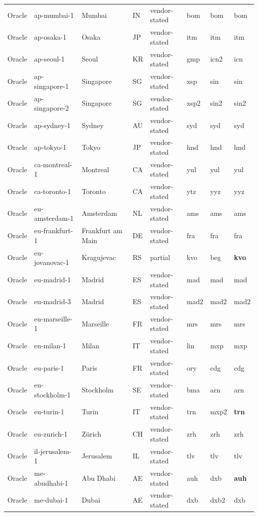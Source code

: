 \begin{longtable}{llllllll}
Oracle & ap-mumbai-1 & Mumbai & IN & vendor-stated & bom & bom & bom \\
Oracle & ap-osaka-1 & Osaka & JP & vendor-stated & itm & itm & itm \\
Oracle & ap-seoul-1 & Seoul & KR & vendor-stated & gmp & icn2 & icn \\
Oracle & ap-singapore-1 & Singapore & SG & vendor-stated & xsp & sin & sin \\
Oracle & ap-singapore-2 & Singapore & SG & vendor-stated & xsp2 & sin2 & sin2 \\
Oracle & ap-sydney-1 & Sydney & AU & vendor-stated & syd & syd & syd \\
Oracle & ap-tokyo-1 & Tokyo & JP & vendor-stated & hnd & hnd & hnd \\
Oracle & ca-montreal-1 & Montreal & CA & vendor-stated & yul & yul & yul \\
Oracle & ca-toronto-1 & Toronto & CA & vendor-stated & ytz & yyz & yyz \\
Oracle & eu-amsterdam-1 & Amsterdam & NL & vendor-stated & ams & ams & ams \\
Oracle & eu-frankfurt-1 & Frankfurt am Main & DE & vendor-stated & fra & fra & fra \\
Oracle & eu-jovanovac-1 & Kragujevac & RS & partial & kvo & beg & \textbf{kvo} \\
Oracle & eu-madrid-1 & Madrid & ES & vendor-stated & mad & mad & mad \\
Oracle & eu-madrid-3 & Madrid & ES & vendor-stated & mad2 & mad2 & mad2 \\
Oracle & eu-marseille-1 & Marseille & FR & vendor-stated & mrs & mrs & mrs \\
Oracle & eu-milan-1 & Milan & IT & vendor-stated & lin & mxp & mxp \\
Oracle & eu-paris-1 & Paris & FR & vendor-stated & ory & cdg & cdg \\
Oracle & eu-stockholm-1 & Stockholm & SE & vendor-stated & bma & arn & arn \\
Oracle & eu-turin-1 & Turin & IT & vendor-stated & trn & mxp2 & \textbf{trn} \\
Oracle & eu-zurich-1 & Zürich & CH & vendor-stated & zrh & zrh & zrh \\
Oracle & il-jerusalem-1 & Jerusalem & IL & vendor-stated & tlv & tlv & tlv \\
Oracle & me-abudhabi-1 & Abu Dhabi & AE & vendor-stated & auh & dxb & \textbf{auh} \\
Oracle & me-dubai-1 & Dubai & AE & vendor-stated & dxb & dxb2 & dxb \\

\end{longtable}
